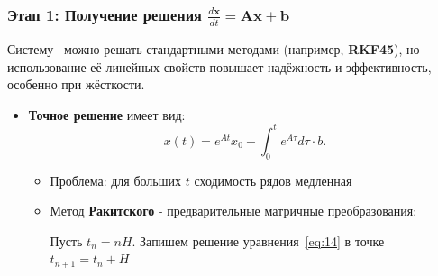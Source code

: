 	\subsubsection{Этап 1: Получение решения $\frac{d \mathbf{x}}{d t} = \mathbf{A} \mathbf{x} + \mathbf{b}$}
	Систему~ можно решать стандартными методами (например, \textbf{RKF45}), но использование её линейных свойств повышает надёжность и эффективность, особенно при жёсткости.
	\begin{itemize}[leftmargin=1em]
		\item \textbf{Точное решение} имеет вид:
		\begin{equation}
			x(t) = e^{A t} x_0 + \int_0^t e^{A \tau} d \tau \cdot b.
			\label{eq:14}
		\end{equation}
		\begin{itemize}
			\item Проблема: для больших \(t\) сходимость рядов медленная
			\item Метод \textbf{Ракитского} - предварительные матричные преобразования: 
			\par
			Пусть \( t_n = nH \). Запишем решение уравнения~\eqref{eq:14} в точке \( t_{n+1} = t_n + H \)
			

\end{itemize}
\end{itemize}
